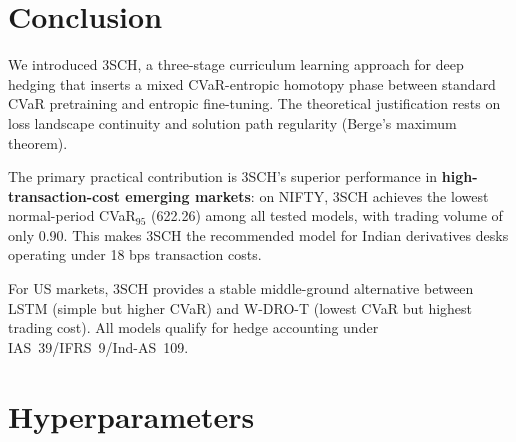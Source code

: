 \documentclass[11pt]{article}
\begin{document}
\section{Conclusion}

We introduced 3SCH, a three-stage curriculum learning approach for deep hedging that inserts a mixed CVaR-entropic homotopy phase between standard CVaR pretraining and entropic fine-tuning. The theoretical justification rests on loss landscape continuity and solution path regularity (Berge's maximum theorem).

The primary practical contribution is 3SCH's superior performance in \textbf{high-transaction-cost emerging markets}: on NIFTY, 3SCH achieves the lowest normal-period CVaR$_{95}$ (622.26) among all tested models, with trading volume of only 0.90. This makes 3SCH the recommended model for Indian derivatives desks operating under 18 bps transaction costs.

For US markets, 3SCH provides a stable middle-ground alternative between LSTM (simple but higher CVaR) and W-DRO-T (lowest CVaR but highest trading cost). All models qualify for hedge accounting under IAS~39/IFRS~9/Ind-AS~109.




\appendix

\section{Hyperparameters}
\end{document}
